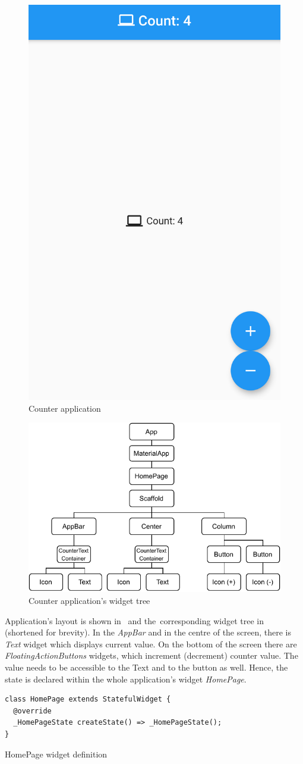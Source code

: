 \begin{figure}[htp]
    \centering
    \includegraphics[width=0.33\linewidth]{img/flutter/counter_app_base.png}
    \caption{Counter application}
    \label{fig:counter-app}
\end{figure}

\begin{figure}[htp]
    \centering
    \includegraphics[width=0.75\linewidth]{img/flutter/counter-base.pdf}
    \caption{Counter application's widget tree}
    \label{fig:counter-app-widget-tree}
\end{figure}

Application's layout is shown in~ and the~corresponding widget tree in~ (shortened for brevity). In the \textit{AppBar} and in the centre of the screen, there is \textit{Text} widget which displays current value. On the bottom of the screen there are \textit{FloatingActionButtons} widgets, which increment (decrement) counter value. The value needs to be accessible to the Text and to the button as well. Hence, the state is declared within the whole application's widget \textit{HomePage}.  

\begin{listing}[ht]
\begin{verbatim}
class HomePage extends StatefulWidget {
  @override
  _HomePageState createState() => _HomePageState();
}
\end{verbatim}
\caption{HomePage widget definition}
\label{listing:counter-homepage-widget}
\end{listing}

